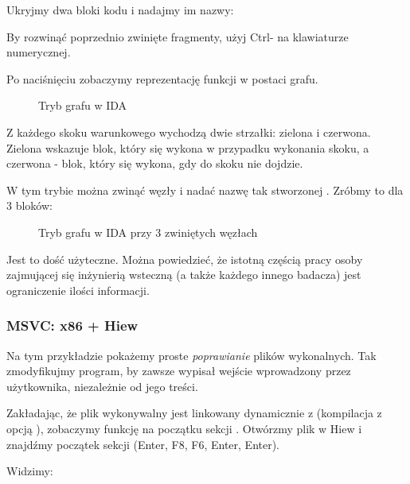 Ukryjmy dwa bloki kodu i nadajmy im nazwy:



By rozwinąć poprzednio zwinięte fragmenty, użyj Ctrl-\q{+} na klawiaturze numerycznej.

\clearpage
Po naciśnięciu  zobaczymy reprezentację funkcji w postaci grafu.

\begin{figure}[H]
\centering
{}
\caption{Tryb grafu w IDA}
\label{fig:ex3_IDA_1}
\end{figure}

Z każdego skoku warunkowego wychodzą dwie strzałki: zielona i czerwona.
Zielona wskazuje blok, który się wykona w przypadku wykonania skoku, a czerwona - blok, który się wykona, gdy do skoku nie dojdzie.

\clearpage
W tym trybie można zwinąć węzły i nadać nazwę tak stworzonej .
Zróbmy to dla 3 bloków:

\begin{figure}[H]
\centering
{}
\caption{Tryb grafu w IDA przy 3 zwiniętych węzłach}
\label{fig:ex3_IDA_2}
\end{figure}

Jest to dość użyteczne.
Można powiedzieć, że istotną częścią pracy osoby zajmującej się inżynierią wsteczną (a także każdego innego badacza) jest ograniczenie ilości informacji.



\clearpage
\subsubsection{MSVC: x86 + Hiew}

Na tym przykładzie pokażemy proste \emph{poprawianie} plików wykonalnych.
Tak zmodyfikujmy program, by zawsze wypisał wejście wprowadzony przez użytkownika, niezależnie od jego treści.

Zakładając, że plik wykonywalny jest linkowany dynamicznie z  (kompilacja z opcją ),
zobaczymy funkcję \main na początku sekcji .
Otwórzmy plik w Hiew i znajdźmy początek sekcji  (Enter, F8, F6, Enter, Enter).

Widzimy:

